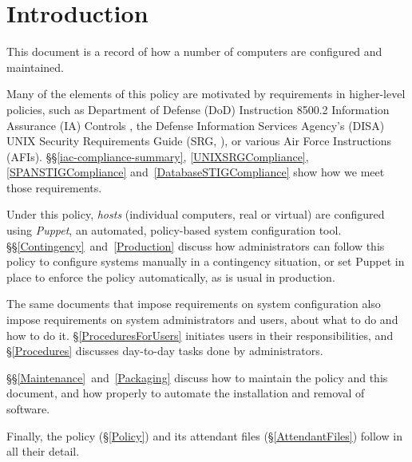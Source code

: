 \chapter{Introduction}
\label{Introduction}

This document is a record of how a number of computers are configured and
maintained. 

Many of the elements of this policy are motivated by requirements in
higher-level policies, such as Department of Defense (DoD) Instruction
8500.2 Information Assurance (IA) Controls \cite{dodi-8500-2}, the Defense
Information Services Agency's (DISA) UNIX Security Requirements Guide
(SRG, \cite{unix-srg}), or various Air Force Instructions (AFIs).
\S\S\ref{iac-compliance-summary}, \ref{UNIXSRGCompliance},
\ref{SPANSTIGCompliance} and~\ref{DatabaseSTIGCompliance} show how we meet
those requirements.

Under this policy, \emph{hosts} (individual computers, real or virtual)
are configured using \emph{Puppet}, an automated, policy-based
system configuration tool.  \S\S\ref{Contingency}~and~\ref{Production}
discuss how administrators can follow this policy to configure systems
manually in a contingency situation, or set Puppet in place to enforce the
policy automatically, as is usual in production.

The same documents that impose requirements on system configuration also
impose requirements on system administrators and users, about what to do
and how to do it. \S\ref{ProceduresForUsers} initiates users in their
responsibilities, and \S\ref{Procedures} discusses day-to-day tasks done
by administrators.

\S\S\ref{Maintenance}~and~\ref{Packaging} discuss how to maintain the
policy and this document, and how properly to automate the installation
and removal of software.

Finally, the policy (\S\ref{Policy}) and its attendant files
(\S\ref{AttendantFiles}) follow in all their detail.


